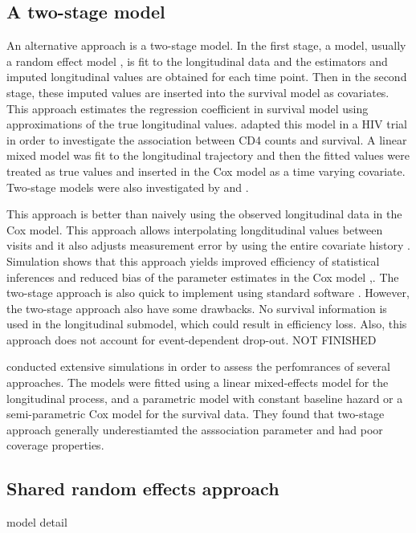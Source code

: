\documentclass{article}
\numberwithin{equation}{section}
\begin{document}
\subsection{A two-stage model}
An alternative approach is a two-stage model. In the first stage, a model, usually a random effect model \cite{laird1982random}, is fit to the longitudinal data and the estimators and imputed longitudinal values are obtained for each time point. Then in the second stage, these imputed values are inserted into the survival model as covariates. This approach estimates the regression coefficient in survival model using approximations of the true longitudinal values. \cite{tsiatis1995modeling} adapted this model in a HIV trial in order to investigate the association between CD4 counts and survival. A linear mixed model was fit to the longitudinal trajectory and then the fitted values were treated as true values and inserted in the Cox model as a time varying covariate. Two-stage models were also investigated by \cite{dafni1998evaluating} and \cite{bycott1998comparison}. 

This approach is better than naively using the observed longitudinal data in the Cox model. This approach allows interpolating longditudinal values between visits and it also adjusts measurement error by using the entire covariate history \cite{faucett1996simultaneously}. Simulation shows that this approach yields improved efficiency of statistical inferences and reduced bias of the parameter estimates in the Cox model \cite{dafni1998evaluating},\cite{bycott1998comparison}. The two-stage approach is also quick to implement using standard software \cite{sweeting2011joint}. However, the two-stage approach also have some drawbacks. No survival information is used in the longitudinal submodel, which could result in efficiency loss. Also, this approach does not account for event-dependent drop-out. NOT FINISHED

 \cite{sweeting2011joint} conducted extensive simulations in order to assess the perfomrances of several approaches. The models were fitted using a linear mixed-effects model for the longitudinal process, and a parametric model with constant baseline hazard or a semi-parametric Cox model for the survival data. They found that two-stage approach generally underestiamted the asssociation parameter and had poor coverage properties.    

\subsection{Shared random effects approach}
model detail 
\end{document}
